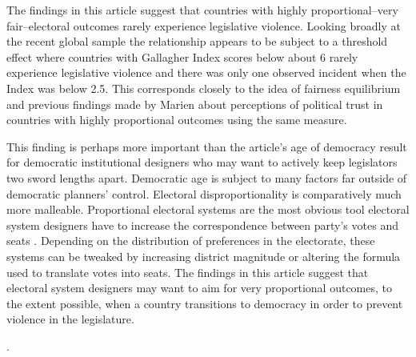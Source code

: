 \documentclass[a4paper]{article}\usepackage[]{graphicx}\usepackage[]{color}
\begin{document}
The findings in this article suggest that countries with highly proportional--very fair--electoral outcomes rarely experience legislative violence. Looking broadly at the recent global sample the relationship appears to be subject to a threshold effect where countries with Gallagher Index scores below about 6 rarely experience legislative violence and there was only one observed incident when the Index was below 2.5. This corresponds closely to the idea of fairness equilibrium and previous findings made by Marien \citeyearpar{Marien2011} about perceptions of political trust in countries with highly proportional outcomes using the same measure.

This finding is perhaps more important than the article's age of democracy result for democratic institutional designers who may want to actively keep legislators two sword lengths apart. Democratic age is subject to many factors far outside of democratic planners' control. Electoral disproportionality is comparatively much more malleable. Proportional electoral systems are the most obvious tool electoral system designers have to increase the correspondence between party's votes and seats \citep{Carey2011}. Depending on the distribution of preferences in the electorate, these systems can be tweaked by increasing district magnitude or altering the formula used to translate votes into seats. The findings in this article suggest that electoral system designers may want to aim for very proportional outcomes, to the extent possible, when a country transitions to democracy in order to prevent violence in the legislature.

 \cite[220]{Schwarzmantel2010}. 
\end{document}
